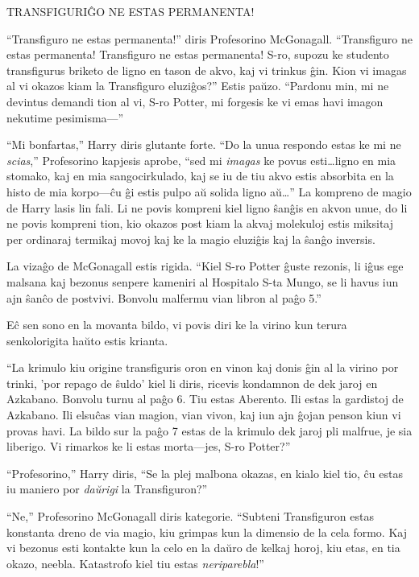 TRANSFIGURIĜO NE ESTAS PERMANENTA!

``Transfiguro ne estas permanenta!'' diris Profesorino
McGonagall. ``Transfiguro ne estas permanenta! Transfiguro ne
estas permanenta! S-ro, supozu ke studento transfigurus briketo de
ligno en tason de akvo, kaj vi trinkus ĝin. Kion vi imagas al vi
okazos kiam la Transfiguro eluziĝos?'' Estis paŭzo. ``Pardonu min,
mi ne devintus demandi tion al vi, S-ro Potter, mi forgesis ke vi emas
havi imagon nekutime pesimisma—''

``Mi bonfartas,'' Harry diris glutante forte. ``Do la unua respondo
estas ke mi ne \emph{scias},'' Profesorino kapjesis aprobe, ``sed mi
\emph{imagas} ke povus esti\ldots ligno en mia stomako, kaj en mia
sangocirkulado, kaj se iu de tiu akvo estis absorbita en la histo de
mia korpo—ĉu ĝi estis pulpo aŭ solida ligno aŭ\ldots'' La kompreno de
magio de Harry lasis lin fali. Li ne povis kompreni kiel ligno ŝanĝis
en akvon unue, do li ne povis kompreni tion, kio okazos post kiam la
akvaj molekuloj estis miksitaj per ordinaraj termikaj movoj kaj ke la
magio eluziĝis kaj la ŝanĝo inversis.


La vizaĝo de McGonagall estis rigida. ``Kiel S-ro Potter ĝuste
rezonis, li iĝus ege malsana kaj bezonus senpere kameniri al Hospitalo
S-ta Mungo, se li havus iun ajn ŝanĉo de postvivi. Bonvolu malfermu
vian libron al paĝo 5.''

Eĉ sen sono en la movanta bildo, vi povis diri ke la virino kun terura
senkolorigita haŭto estis krianta.

``La krimulo kiu origine transfiguris oron en vinon kaj donis ĝin al
la virino por trinki, 'por repago de ŝuldo' kiel li diris, ricevis
kondamnon de dek jaroj en Azkabano. Bonvolu turnu al paĝo 6. Tiu estas
Aberento. Ili estas la gardistoj de Azkabano. Ili elsuĉas vian magion,
vian vivon, kaj iun ajn ĝojan penson kiun vi provas havi. La bildo sur
la paĝo 7 estas de la krimulo dek jaroj pli malfrue, je sia
liberigo. Vi rimarkos ke li estas morta—jes, S-ro Potter?''

``Profesorino,'' Harry diris, ``Se la plej malbona okazas, en kialo
kiel tio, ĉu estas iu maniero por \emph{daŭrigi} la Transfiguron?''

``Ne,'' Profesorino McGonagall diris kategorie. ``Subteni
Transfiguron estas konstanta dreno de via magio, kiu grimpas kun la
dimensio de la cela formo. Kaj vi bezonus esti kontakte kun la celo en
la daŭro de kelkaj horoj, kiu etas, en tia okazo, neebla. Katastrofo
kiel tiu estas \emph{neriparebla}!''


